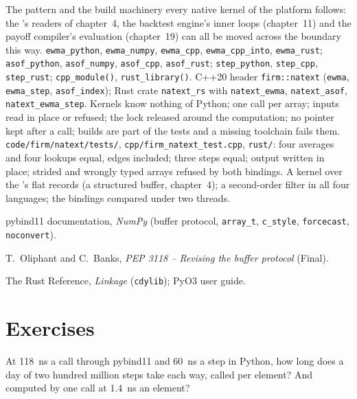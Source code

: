 \begin{build}
 The pattern and the build machinery every native kernel of the platform follows: the 's readers of
chapter~4, the backtest engine's inner loops (chapter~11) and the payoff compiler's evaluation (chapter~19) can all be moved across the
boundary this way.
 \texttt{ewma\_python}, \texttt{ewma\_numpy}, \texttt{ewma\_cpp}, \texttt{ewma\_cpp\_into}, \texttt{ewma\_rust};
\texttt{asof\_python}, \texttt{asof\_numpy}, \texttt{asof\_cpp}, \texttt{asof\_rust}; \texttt{step\_python}, \texttt{step\_cpp},
\texttt{step\_rust}; \texttt{cpp\_module()}, \texttt{rust\_library()}. C++20 header \texttt{firm::natext} (\texttt{ewma},
\texttt{ewma\_step}, \texttt{asof\_index}); Rust crate \texttt{natext\_rs} with \texttt{natext\_ewma}, \texttt{natext\_asof},
\texttt{natext\_ewma\_step}.
 Kernels know nothing of Python; one call per array; inputs read in place or refused; the lock released around the
computation; no pointer kept after a call; builds are part of the tests and a missing toolchain fails them.
 \texttt{code/firm/natext/tests/}, \texttt{cpp/firm\_natext\_test.cpp}, \texttt{rust/}: four averages and four
lookups equal, edges included; three steps equal; output written in place; strided and wrongly typed arrays refused by both bindings.
 A kernel over the 's flat records (a structured buffer, chapter~4); a second-order filter in all four
languages; the bindings compared under two threads.
\end{build}

\begin{omsources}
\item pybind11 documentation, \emph{NumPy} (buffer protocol, \texttt{array\_t}, \texttt{c\_style}, \texttt{forcecast},
\texttt{noconvert}).
\item T.~Oliphant and C.~Banks, \emph{PEP 3118 -- Revising the buffer protocol} (Final).
\item The Rust Reference, \emph{Linkage} (\texttt{cdylib}); PyO3 user guide.
\end{omsources}

\section{Exercises}

\begin{exercise}[$\star$]\label{exo:pl:native-extensions:1}
At 118~ns a call through pybind11 and 60~ns a step in Python, how long does a day of two hundred million steps take each way, called
per element? And computed by one call at 1.4~ns an element?
\end{exercise}

